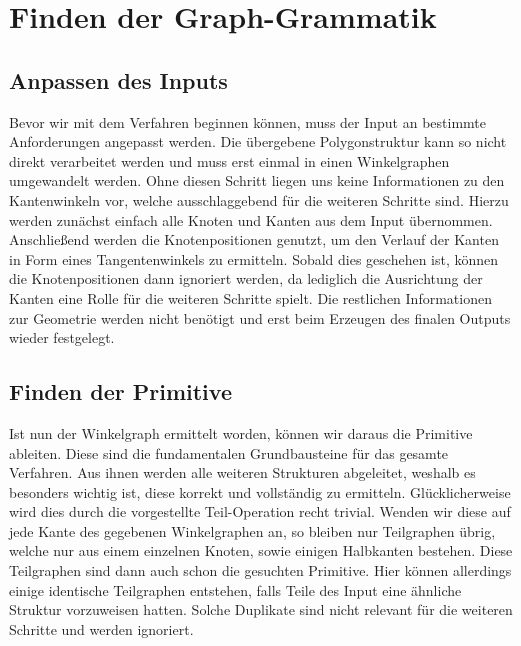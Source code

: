 \section{Finden der Graph-Grammatik}
\subsection{Anpassen des Inputs}
Bevor wir mit dem Verfahren beginnen können, muss der Input an bestimmte Anforderungen angepasst werden. Die übergebene Polygonstruktur
kann so nicht direkt verarbeitet werden und muss erst einmal in einen Winkelgraphen umgewandelt werden. Ohne diesen Schritt liegen uns keine
Informationen zu den Kantenwinkeln vor, welche ausschlaggebend für die weiteren Schritte sind. Hierzu werden zunächst einfach alle Knoten und
Kanten aus dem Input übernommen. Anschließend werden die Knotenpositionen genutzt, um den Verlauf der Kanten in Form eines Tangentenwinkels zu
ermitteln. Sobald dies geschehen ist, können die Knotenpositionen dann ignoriert werden, da lediglich die Ausrichtung der Kanten eine Rolle
für die weiteren Schritte spielt. Die restlichen Informationen zur Geometrie werden nicht benötigt und erst beim Erzeugen des finalen Outputs
wieder festgelegt.

\subsection{Finden der Primitive}
Ist nun der Winkelgraph ermittelt worden, können wir daraus die Primitive ableiten. Diese sind die fundamentalen Grundbausteine für das
gesamte Verfahren. Aus ihnen werden alle weiteren Strukturen abgeleitet, weshalb es besonders wichtig ist, diese korrekt und vollständig zu
ermitteln. Glücklicherweise wird dies durch die vorgestellte Teil-Operation recht trivial. Wenden wir diese auf jede Kante des gegebenen
Winkelgraphen an, so bleiben nur Teilgraphen übrig, welche nur aus einem einzelnen Knoten, sowie einigen Halbkanten bestehen. Diese Teilgraphen
sind dann auch schon die gesuchten Primitive. Hier können allerdings einige identische Teilgraphen entstehen, falls Teile des Input eine ähnliche
Struktur vorzuweisen hatten. Solche Duplikate sind nicht relevant für die weiteren Schritte und werden ignoriert.

